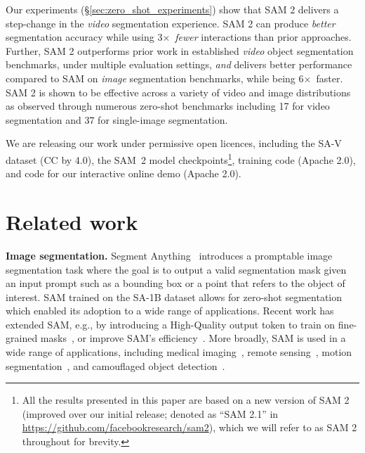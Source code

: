 \documentclass[]{fairmeta}
\renewcommand{\paragraph}[1]{\vspace{1.25mm}\noindent\textbf{#1}}
\newcommand{\x}{{\times}}
\def\x{$\times$}
\newcommand{\secref}[1]{\S\ref{#1}}
\renewcommand{\paragraph}[1]{\vspace{1.25mm}\noindent\textbf{#1}}
\begin{document}
Our experiments (\secref{sec:zero_shot_experiments}) show that SAM 2 delivers a step-change in the \textit{video} segmentation experience.
SAM 2 can produce \textit{better} segmentation accuracy while using {3\x}~\textit{fewer} interactions than prior approaches. Further, SAM 2 outperforms prior work in established \textit{video} object segmentation benchmarks, under multiple evaluation settings, \textit{and} delivers better performance compared to SAM on \textit{image} segmentation benchmarks, while being 6\x~faster. SAM 2 is shown to be effective across a variety of video and image distributions as observed through numerous zero-shot benchmarks including 17 for video segmentation and 37 for single-image segmentation.

We are releasing our work under permissive open licences, including the SA-V dataset (CC by 4.0), the SAM~2 model checkpoints\footnote{All the results presented in this paper are based on a new version of SAM 2 (improved over our initial release; denoted as ``SAM 2.1'' in \url{https://github.com/facebookresearch/sam2}), which we will refer to as SAM 2 throughout for brevity.}, training code (Apache 2.0), and code for our interactive online demo (Apache 2.0).

\section{Related work}
\label{sec:related_work}

\paragraph{Image segmentation.} Segment Anything~\citep{kirillov2023segment} introduces a promptable image segmentation task where the goal is to output a valid segmentation mask given an input prompt such as a bounding box or a point that refers to the object of interest. SAM trained on the SA-1B dataset allows for zero-shot segmentation which enabled its adoption to a wide range of applications. Recent work has extended SAM, e.g., by introducing a High-Quality output token to train on fine-grained masks~\citep{ke2024segment}, or improve SAM's efficiency~\citep{xiong2023efficientsam,zhang2023faster,zhao2023fast}. More broadly, SAM is used in a wide range of applications, including medical imaging~\citep{ma2024segment,deng2023segment,mazurowski2023segment,wu2023medical}, remote sensing~\citep{chen2024rsprompter,ren2024segment}, motion segmentation~\citep{xie2024moving}, and camouflaged object detection~\citep{tang2023can}.
\end{document}

